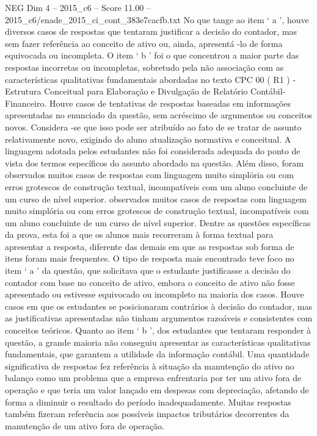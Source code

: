 \begin{textsample}{NEG Dim 4 – 2015\_c6 – Score 11.00 – 2015\_c6/enade\_2015\_ci\_cont\_383e7cacfb.txt}
No que tange ao item ‘ a ’, houve diversos casos de respostas que tentaram justificar a decisão do contador, mas sem fazer referência ao conceito de ativo ou, ainda, apresentá -lo de forma equivocada ou incompleta.
O item ‘ b ’ foi o que concentrou a maior parte das respostas incorretas ou incompletas, sobretudo pela não associação com as características qualitativas fundamentais abordadas no texto CPC 00 ( R1 ) - Estrutura Conceitual para Elaboração e Divulgação de Relatório Contábil-Financeiro.
Houve casos de tentativas de respostas baseadas em informações apresentadas no enunciado da questão, sem acréscimo de argumentos ou conceitos novos.
Considera -se que isso pode ser atribuído ao fato de se tratar de assunto relativamente novo, exigindo do aluno atualização normativa e conceitual.
A linguagem adotada pelos estudantes não foi considerada adequada do ponto de vista dos termos específicos do assunto abordado na questão.
Além disso, foram observados muitos casos de respostas com linguagem muito simplória ou com erros grotescos de construção textual, incompatíveis com um aluno concluinte de um curso de nível superior. observados muitos casos de respostas com linguagem muito simplória ou com erros grotescos de construção textual, incompatíveis com um aluno concluinte de um curso de nível superior.
Dentre as questões específicas da prova, esta foi a que os alunos mais recorreram à forma textual para apresentar a resposta, diferente das demais em que as respostas sob forma de itens foram mais frequentes.
O tipo de resposta mais encontrado teve foco no item ‘ a ’ da questão, que solicitava que o estudante justificasse a decisão do contador com base no conceito de ativo, embora o conceito de ativo não fosse apresentado ou estivesse equivocado ou incompleto na maioria dos casos.
Houve casos em que os estudantes se posicionaram contrários à decisão do contador, mas as justificativas apresentadas não tinham argumentos razoáveis e consistentes com conceitos teóricos.
Quanto ao item ‘ b ’, dos estudantes que tentaram responder à questão, a grande maioria não conseguiu apresentar as características qualitativas fundamentais, que garantem a utilidade da informação contábil.
Uma quantidade significativa de respostas fez referência à situação da manutenção do ativo no balanço como um problema que a empresa enfrentaria por ter um ativo fora de operação e que teria um valor lançado em despesas com depreciação, afetando de forma a diminuir o resultado do período inadequadamente.
Muitas respostas também fizeram referência aos possíveis impactos tributários decorrentes da manutenção de um ativo fora de operação.

\end{textsample}
